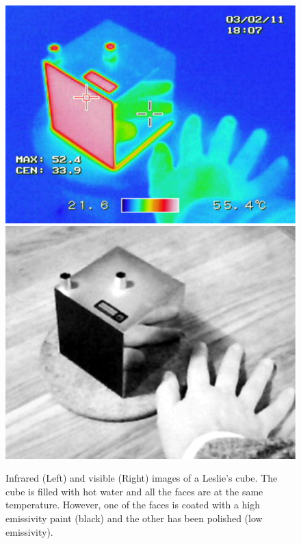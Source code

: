 			\begin{figure}[ht!]
				\centering
				\captionsetup{justification=centering,margin=2cm}
				\includegraphics[scale=0.6]{Figures/Chapter03/LesliesCube.pdf}
				\includegraphics[scale=0.57]{Figures/Chapter03/LesliesCube2.pdf}
				\caption{Infrared (Left) and visible (Right) images of a Leslie's cube. The cube is filled with hot water and all the faces are at the same temperature. However,  one of the faces is coated with a high emissivity paint (black) and the other has been polished (low emissivity).}\label{fig3.5}
			\end{figure}	
			

